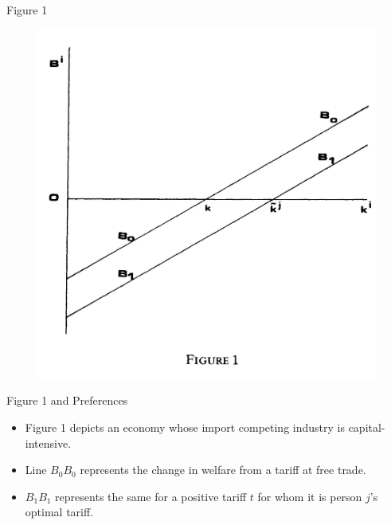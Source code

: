 \documentclass[aspectratio=169]{beamer}
\begin{document}
\begin{frame}{Figure 1}

\begin{figure}
    \centering
    \includegraphics[scale=0.95]{MayerFig1.jpg}
    \label{fig:Fig1}
\end{figure}
    
\end{frame}


\begin{frame}{Figure 1 and Preferences}

\begin{itemize}
    \item<1-> Figure 1 depicts an economy whose import competing industry is capital-intensive.
    \item<2-> Line $ B_{0} B_{0} $ represents the change in welfare from a tariff at free trade.
    \item<3-> $ B_{1} B_{1} $ represents the same for a positive tariff $ t $ for whom it is person $ j $’s optimal tariff. 
\end{itemize}
    
\end{frame}

\end{document}
